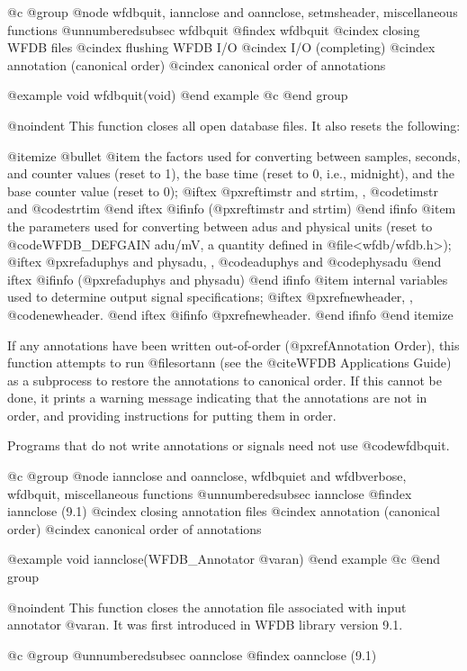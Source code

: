 {{{{{{{{{@c @group
@node     wfdbquit, iannclose and oannclose, setmsheader, miscellaneous functions
@unnumberedsubsec wfdbquit
@findex wfdbquit
@cindex closing WFDB files
@cindex flushing WFDB I/O
@cindex I/O (completing)
@cindex annotation (canonical order)
@cindex canonical order of annotations

@example
void wfdbquit(void)
@end example
@c @end group

@noindent
This function closes all open database files.  It also resets the following:

@itemize @bullet
@item
the factors used for converting between samples, seconds, and counter
values (reset to 1), the base time (reset to 0, i.e., midnight), and the
base counter value (reset to 0);
@iftex
@pxref{timstr and strtim, , @code{timstr} and @code{strtim}}
@end iftex
@ifinfo
(@pxref{timstr and strtim})
@end ifinfo
@item
the parameters used for converting between adus and physical units (reset to
@code{WFDB_DEFGAIN} adu/mV, a quantity defined in @file{<wfdb/wfdb.h>});
@iftex
@pxref{aduphys and physadu, , @code{aduphys} and @code{physadu}}
@end iftex
@ifinfo
(@pxref{aduphys and physadu})
@end ifinfo
@item
internal variables used to determine output signal specifications;
@iftex
@pxref{newheader, , @code{newheader}}.
@end iftex
@ifinfo
@pxref{newheader}.
@end ifinfo
@end itemize

If any annotations have been written out-of-order (@pxref{Annotation Order}),
this function attempts to run @file{sortann} (see the @cite{WFDB
Applications Guide}) as a subprocess to restore the annotations to canonical
order.  If this cannot be done, it prints a warning message indicating that the
annotations are not in order, and providing instructions for putting them in
order.

Programs that do not write annotations or signals need not use
@code{wfdbquit}.

@c @group
@node     iannclose and oannclose, wfdbquiet and wfdbverbose, wfdbquit, miscellaneous functions
@unnumberedsubsec iannclose
@findex iannclose (9.1)
@cindex closing annotation files
@cindex annotation (canonical order)
@cindex canonical order of annotations

@example
void iannclose(WFDB_Annotator @var{an})
@end example
@c @end group

@noindent
This function closes the annotation file associated with input annotator
@var{an}.  It was first introduced in WFDB library version 9.1.

@c @group
@unnumberedsubsec oannclose
@findex oannclose (9.1)

}}}}}}}}}

